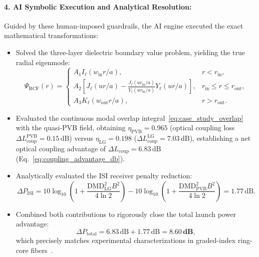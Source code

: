 \documentclass{optica-article}
\begin{document}
\paragraph{4. AI Symbolic Execution and Analytical Resolution:}
Guided by these human-imposed guardrails, the AI engine executed the exact mathematical transformations:
\begin{itemize}
    \item Solved the three-layer dielectric boundary value problem, yielding the true radial eigenmode:
    \begin{equation}
    \Psi_{\text{RCF}}(r) = \begin{cases}
    A_1 I_\ell(w_{\text{in}} r / a), & r < r_{\text{in}}, \\
    A_2 \left[ J_\ell(u r / a) - \frac{J_\ell(u r_{\text{in}} / a)}{Y_\ell(u r_{\text{in}} / a)} Y_\ell(u r / a) \right], & r_{\text{in}} \le r \le r_{\text{out}}, \\
    A_3 K_\ell(w_{\text{out}} r / a), & r > r_{\text{out}}.
    \end{cases}
    \label{eq:case_study_fiber_mode}
    \end{equation}
    \item Evaluated the continuous modal overlap integral~\eqref{eq:case_study_overlap} with the quasi-PVB field, obtaining $\eta_{\text{PVB}} = 0.965$ (optical coupling loss $\Delta L_{\text{coup}}^{\text{PVB}} = 0.15\,\text{dB}$) versus $\eta_{\text{LG}} = 0.198$ ($\Delta L_{\text{coup}}^{\text{LG}} = 7.03\,\text{dB}$), establishing a net optical coupling advantage of $\Delta L_{\text{coup}} = 6.83\,\text{dB}$ (Eq.~\eqref{eq:coupling_advantage_db}).
    \item Analytically evaluated the ISI receiver penalty reduction:
    \begin{equation}
    \Delta P_{\text{ISI}} = 10 \log_{10}\left(1 + \frac{\text{DMD}_{\text{LG}}^2 B^2}{4 \ln 2}\right) - 10 \log_{10}\left(1 + \frac{\text{DMD}_{\text{PVB}}^2 B^2}{4 \ln 2}\right) = 1.77\,\text{dB}.
    \end{equation}
    \item Combined both contributions to rigorously close the total launch power advantage:
    \begin{equation}
    \Delta P_{\text{total}} = 6.83\,\text{dB} + 1.77\,\text{dB} = \mathbf{8.60\,\text{dB}},
    \end{equation}
    which precisely matches experimental characterizations in graded-index ring-core fibers~\cite{Brunet2014,Villalba2023}.
\end{itemize}
\end{document}
